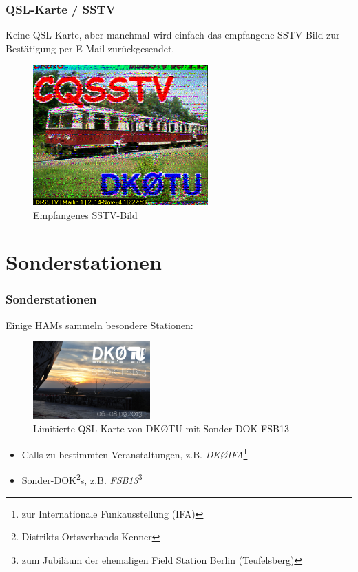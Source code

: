 \begin{frame}
  \frametitle{QSL-Karte / SSTV}

  Keine QSL-Karte, aber manchmal wird einfach das empfangene SSTV-Bild zur
  Bestätigung per E-Mail zurückgesendet.

  \begin{center}
    \begin{figure}
      \includegraphics[width=0.6\textwidth,height=.6\textheight,keepaspectratio]{bv13/QSL_SSTV_2014-11-24_162753.png}
      \caption{Empfangenes SSTV-Bild}
    \end{figure}
  \end{center}

\end{frame}

\section{Sonderstationen}

\begin{frame}
  \frametitle{Sonderstationen}

  Einige HAMs sammeln besondere Stationen:

  \begin{center}
    \begin{figure}
      \includegraphics[width=0.4\textwidth,height=.35\textheight,keepaspectratio]{bv13/DK0TU_SDOK_FSB13.jpg}
      \caption{Limitierte QSL-Karte von DKØTU mit Sonder-DOK FSB13}
    \end{figure}
  \end{center}

  \begin{itemize}
    \item Calls zu bestimmten Veranstaltungen, z.B.
      \emph{DKØIFA}\footnote{zur Internationale Funkausstellung (IFA)}
    \item Sonder-DOK\footnote{Distrikts-Ortsverbands-Kenner}s, z.B.
      \emph{FSB13}\footnote{zum Jubiläum der ehemaligen Field Station
      Berlin (Teufelsberg)}
  \end{itemize}

\end{frame}

